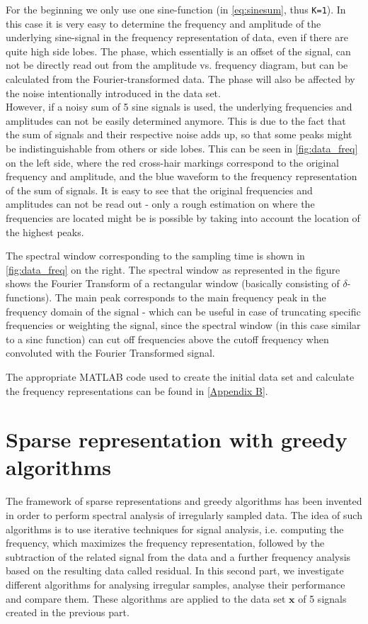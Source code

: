 For the beginning we only use one sine-function (in \cref{eq:sinesum}, thus \texttt{K=1}). In this case it is very easy to determine the frequency and amplitude of the underlying sine-signal in the frequency representation of data, even if there are quite high side lobes. The phase, which essentially is an offset of the signal, can not be directly read out from the amplitude vs. frequency diagram, but can be calculated from the Fourier-transformed data. The phase will also be affected by the noise intentionally introduced in the data set.\\
However, if a noisy sum of 5 sine signals is used, the underlying frequencies and amplitudes can not be easily determined anymore. This is due to the fact that the sum of signals and their respective noise adds up, so that some peaks might be indistinguishable from others or side lobes. This can be seen in \cref{fig:data_freq} on the left side, where the red cross-hair markings correspond to the original frequency and amplitude, and the blue waveform to the frequency representation of the sum of signals. It is easy to see that the original frequencies and amplitudes can not be read out - only a rough estimation on where the frequencies are located might be is possible by taking into account the location of the highest peaks.

The spectral window corresponding to the sampling time is shown in \cref{fig:data_freq} on the right. The spectral window as represented in the figure shows the Fourier Transform of a rectangular window (basically consisting of $\delta$-functions). The main peak corresponds to the main frequency peak in the frequency domain of the signal - which can be useful in case of truncating specific frequencies or weighting the signal, since the spectral window (in this case similar to a sinc function) can cut off frequencies above the cutoff frequency when convoluted with the Fourier Transformed signal.

The appropriate MATLAB code used to create the initial data set and calculate the frequency representations can be found in \cref{Appendix B}.


\section{Sparse representation with greedy algorithms}
The framework of sparse representations and greedy algorithms has been invented in order to perform spectral analysis of irregularly sampled data. The idea of such algorithms is to use iterative techniques for signal analysis, i.e. computing the frequency, which maximizes the frequency representation, followed by the subtraction of the related signal from the data and a further frequency analysis based on the resulting data called residual. In this second part, we investigate different algorithms for analysing irregular samples, analyse their performance and compare them. These algorithms are applied to the data set $\boldsymbol{x}$ of 5 signals created in the previous part.
